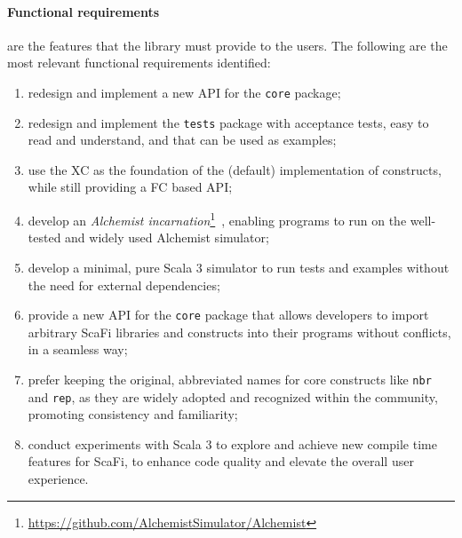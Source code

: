 \paragraph{Functional requirements} are the features that the library must provide to the users. The following are the most relevant functional requirements identified:
\begin{enumerate}[label=\textbf{F.\arabic*}]
    \item redesign and implement a new \ac{API} for the \texttt{core} package;
    \item redesign and implement the \texttt{tests} package with acceptance tests, easy to read and understand, and that can be used as examples;
    \item use the \ac{XC} as the foundation of the (default) implementation of constructs, while still providing a \ac{FC} based API;
    \item develop an \textit{Alchemist incarnation}\footnote{\url{https://github.com/AlchemistSimulator/Alchemist}}~\cite{alchemist}, enabling \this programs to run on the well-tested and widely used Alchemist simulator;
    \item develop a minimal, pure Scala 3 simulator to run tests and examples without the need for external dependencies;
    \item provide a new API for the \texttt{core} package that allows developers to import arbitrary ScaFi libraries and constructs into their programs without conflicts, in a seamless way;
    \item prefer keeping the original, abbreviated names for core constructs like \texttt{nbr} and \texttt{rep}, as they are widely adopted and recognized within the community, promoting consistency and familiarity;
    \item conduct experiments with Scala 3 to explore and achieve new compile time features for ScaFi, to enhance code quality and elevate the overall user experience.
\end{enumerate}

